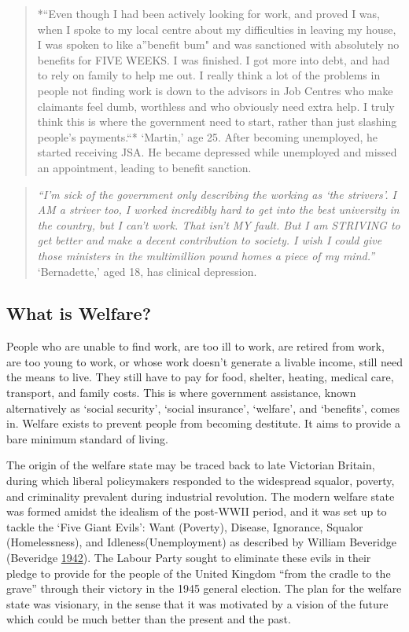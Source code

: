 \documentclass[]{tufte-handout}
\begin{document}
\begin{quote}
*``Even though I had been actively looking for work, and proved I was,
when I spoke to my local centre about my difficulties in leaving my
house, I was spoken to like a''benefit bum" and was sanctioned with
absolutely no benefits for FIVE WEEKS. I was finished. I got more into
debt, and had to rely on family to help me out. I really think a lot of
the problems in people not finding work is down to the advisors in Job
Centres who make claimants feel dumb, worthless and who obviously need
extra help. I truly think this is where the government need to start,
rather than just slashing people's payments.``* `Martin,' age 25. After
becoming unemployed, he started receiving JSA. He became depressed while
unemployed and missed an appointment, leading to benefit sanction.
\end{quote}

\begin{quote}
\emph{``I'm sick of the government only describing the working as `the
strivers'. I AM a striver too, I worked incredibly hard to get into the
best university in the country, but I can't work. That isn't MY fault.
But I am STRIVING to get better and make a decent contribution to
society. I wish I could give those ministers in the multimillion pound
homes a piece of my mind.''} `Bernadette,' aged 18, has clinical
depression.
\end{quote}

\hypertarget{what-is-welfare}{%
\subsection{What is Welfare?}\label{what-is-welfare}}

People who are unable to find work, are too ill to work, are retired
from work, are too young to work, or whose work doesn't generate a
livable income, still need the means to live. They still have to pay for
food, shelter, heating, medical care, transport, and family costs. This
is where government assistance, known alternatively as `social
security', `social insurance', `welfare', and `benefits', comes in.
Welfare exists to prevent people from becoming destitute. It aims to
provide a bare minimum standard of living.

The origin of the welfare state may be traced back to late Victorian
Britain, during which liberal policymakers responded to the widespread
squalor, poverty, and criminality prevalent during industrial
revolution. The modern welfare state was formed amidst the idealism of
the post-WWII period, and it was set up to tackle the `Five Giant
Evils': Want (Poverty), Disease, Ignorance, Squalor (Homelessness), and
Idleness(Unemployment) as described by William Beveridge (Beveridge
\protect\hyperlink{ref-Beveridge1942}{1942}). The Labour Party sought to
eliminate these evils in their pledge to provide for the people of the
United Kingdom ``from the cradle to the grave'' through their victory in
the 1945 general election. The plan for the welfare state was visionary,
in the sense that it was motivated by a vision of the future which could
be much better than the present and the past.
\end{document}
